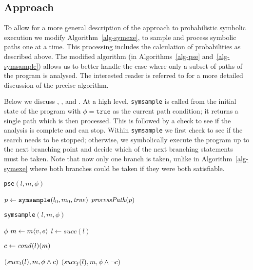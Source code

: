 \subsection{Approach}

To allow for a more general description of the approach to probabilistic symbolic execution we modify Algorithm~\ref{alg-symexe}, to sample and process symbolic paths one at a time. This processing includes the calculation of probabilities as described above.  The modified algorithm (in Algorithms~\ref{alg-pse} and~\ref{alg-symsample}) allows us to better handle the case where only a subset of paths of the program is analysed. The interested reader is referred to \cite{filieri2014statistical} for a more detailed discussion of the precise algorithm.

Below we discuss , ,  and . At a high level, {\tt symsample} is called from the initial state of the program with $\phi=\mathtt{true}$ as the current path condition;  it returns a single path which is then processed.  This is followed by a check to see if the analysis is complete and can stop. Within {\tt symsample} we first check to see if the search needs to be stopped; otherwise, we symbolically execute the program up to the next branching point and decide which of the next branching statements must be taken. Note that now only one branch is taken, unlike in Algorithm~\ref{alg-symexe} where both branches could be taken if they were both satisfiable. 

\begin{minipage}{0.4\textwidth}
\begin{algorithm}[H]
\caption{{\tt pse}$(l,m,\phi)$}
\label{alg-pse}
\begin{algorithmic}
 \REPEAT
  \STATE $p \gets {\tt symsample}(l_0, m_0, \mathit{true})$
  \STATE $\mathit{processPath}(p)$
\end{algorithmic}
\end{algorithm}
\end{minipage}
\begin{minipage}{0.5\textwidth}
\begin{algorithm}[H]
\caption{{\tt symsample}$(l,m,\phi)$}
\label{alg-symsample}
\begin{algorithmic}
 \RETURN $\phi$
 \ENDIF
   \STATE $m \gets m\langle v, e\rangle$
   \STATE $l \gets succ(l)$
 \ENDWHILE
 
 
 \STATE $c \gets \mathit{cond}(l)(m)$
 
   $(\mathit{succ_t}(l), m, \phi \wedge c)$
 \ELSE
   $(\mathit{succ_f}(l), m, \phi \wedge \neg c)$
 \ENDIF
\end{algorithmic}
\end{algorithm}
\end{minipage}

